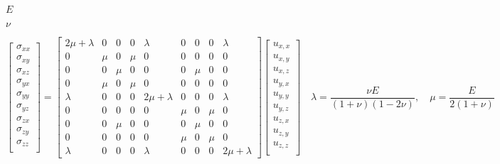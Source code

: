 \documentclass{article}
\begin{document}
$E$
\pagebreak

$\nu$
\pagebreak

\[ \begin{bmatrix} \sigma_{xx}\\ \sigma_{xy}\\ \sigma_{xz}\\ \sigma_{yx}\\ \sigma_{yy}\\ \sigma_{yz}\\ \sigma_{zx}\\ \sigma_{zy}\\ \sigma_{zz}\\ \end{bmatrix} = \begin{bmatrix} 2\mu+\lambda & 0 & 0 & 0 & \lambda & 0 & 0 & 0 & \lambda\\ 0 & \mu & 0 & \mu & 0 & 0 & 0 & 0 & 0\\ 0 & 0 & \mu & 0 & 0 & 0 & \mu & 0 & 0\\ 0 & \mu & 0 & \mu & 0 & 0 & 0 & 0 & 0\\ \lambda & 0 & 0 & 0 & 2\mu+\lambda & 0 & 0 & 0 & \lambda\\ 0 & 0 & 0 & 0 & 0 & \mu & 0 & \mu & 0\\ 0 & 0 & \mu & 0 & 0 & 0 & \mu & 0 & 0\\ 0 & 0 & 0 & 0 & 0 & \mu & 0 & \mu & 0\\ \lambda & 0 & 0 & 0 & \lambda & 0 & 0 & 0 & 2\mu+\lambda \end{bmatrix} \begin{bmatrix} u_{x,x}\\ u_{x,y}\\ u_{x,z}\\ u_{y,x}\\ u_{y,y}\\ u_{y,z}\\ u_{z,x}\\ u_{z,y}\\ u_{z,z}\\ \end{bmatrix} \quad \lambda = \frac{\nu E}{(1+\nu)(1-2\nu)}, \quad \mu=\frac{E}{2(1+\nu)} \]
\pagebreak
\end{document}

